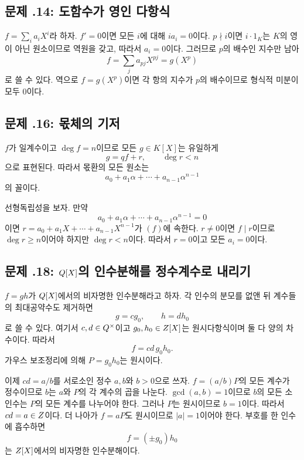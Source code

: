 \subsection*{문제 \thechapter.14: 도함수가 영인 다항식}

\begin{solution}
$f=\sum_i a_iX^i$라 하자. $f'=0$이면 모든 $i$에 대해 $ia_i=0$이다. $p\nmid i$이면 $i\cdot1_K$는 $K$의 영이 아닌 원소이므로 역원을 갖고, 따라서 $a_i=0$이다. 그러므로 $p$의 배수인 지수만 남아
\[
 f=\sum_j a_{pj}X^{pj}=g(X^p)
\]
로 쓸 수 있다. 역으로 $f=g(X^p)$이면 각 항의 지수가 $p$의 배수이므로 형식적 미분이 모두 $0$이다.
\end{solution}

\subsection*{문제 \thechapter.16: 몫체의 기저}

\begin{solution}
$f$가 일계수이고 $\deg f=n$이므로 모든 $g\in K[X]$는 유일하게
\[
 g=qf+r,\qquad \deg r<n
\]
으로 표현된다. 따라서 몫환의 모든 원소는
\[
 a_0+a_1\alpha+\cdots+a_{n-1}\alpha^{n-1}
\]
의 꼴이다.

선형독립성을 보자. 만약
\[
 a_0+a_1\alpha+\cdots+a_{n-1}\alpha^{n-1}=0
\]
이면 $r=a_0+a_1X+\cdots+a_{n-1}X^{n-1}$가 $(f)$에 속한다. $r\ne0$이면 $f\mid r$이므로 $\deg r\ge n$이어야 하지만 $\deg r<n$이다. 따라서 $r=0$이고 모든 $a_i=0$이다.
\end{solution}

\subsection*{문제 \thechapter.18: $Q[X]$의 인수분해를 정수계수로 내리기}

\begin{solution}
$f=gh$가 $Q[X]$에서의 비자명한 인수분해라고 하자. 각 인수의 분모를 없앤 뒤 계수들의 최대공약수도 제거하면
\[
  g=cg_0,
  \qquad
  h=dh_0
\]
로 쓸 수 있다. 여기서 $c,d\in Q^\times$이고 $g_0,h_0\in Z[X]$는 원시다항식이며 둘 다 양의 차수이다. 따라서
\[
  f=cd\,g_0h_0.
\]
가우스 보조정리에 의해 $P=g_0h_0$는 원시이다.

이제 $cd=a/b$를 서로소인 정수 $a,b$와 $b>0$으로 쓰자. $f=(a/b)P$의 모든 계수가 정수이므로 $b$는 $a$와 $P$의 각 계수의 곱을 나눈다. $\gcd(a,b)=1$이므로 $b$의 모든 소인수는 $P$의 모든 계수를 나누어야 한다. 그러나 $P$는 원시이므로 $b=1$이다. 따라서 $cd=a\in Z$이다. 더 나아가 $f=aP$도 원시이므로 $|a|=1$이어야 한다. 부호를 한 인수에 흡수하면
\[
  f=(\pm g_0)h_0
\]
는 $Z[X]$에서의 비자명한 인수분해이다.
\end{solution}

